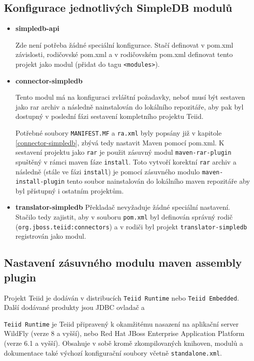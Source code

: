 \documentclass[oneside,12pt,final]{fithesis2}
\begin{document}
\subsection{Konfigurace jednotlivých SimpleDB modulů}
\label{konfigurace}
\begin{itemize}
 \item \textbf{simpledb-api}
 
 Zde není potřeba žádné speciální konfigurace. Stačí definovat v pom.xml závislosti, rodičovské pom.xml a v rodičovském pom.xml definovat tento projekt jako modul (přidat do tagu \texttt{<modules>}).
 \item \textbf{connector-simpledb}
 
 Tento modul má na konfiguraci zvláštní požadavky, neboť musí být sestaven jako rar archiv a následně nainstalován do lokálního repozitáře, aby pak byl dostupný v poslední fázi sestavení kompletního projektu Teiid.
 
 Potřebné soubory \texttt{MANIFEST.MF} a \texttt{ra.xml} byly popsány již v kapitole \ref{connector-simpledb}, zbývá tedy nastavit Maven pomocí pom.xml.
 K sestavení projektu jako \texttt{rar} je použit zásuvný modul \texttt{maven-rar-plugin} spuštěný v rámci maven fáze \texttt{install}. Toto vytvoří korektní \texttt{rar} archiv a následně (stále ve fázi \texttt{install}) je pomocí zásuvného modulo \texttt{maven-install-plugin} tento soubor nainstalován do lokálního maven repozitáře aby byl přístupný i ostatním projektům.
 
 \item \textbf{translator-simpledb}
 Překladač nevyžaduje žádné speciální nastavení. Stačilo tedy zajistit, aby v souboru \texttt{pom.xml} byl definován správný rodič (\texttt{org.jboss.teiid:connectors}) a v rodiči byl projekt \texttt{translator-simpledb} registrován jako modul.
\end{itemize}

\subsection{Nastavení zásuvného modulu maven assembly plugin}
Projekt Teiid je dodáván v distribucích \texttt{Teiid Runtime} nebo \texttt{Teiid Embedded}. Další dodávané produkty jsou JDBC ovladač a 

\texttt{Teiid Runtime} je Teiid připravený k okamžitému nasazení na aplikační server WildFly (verze 8 a vyšší), nebo Red Hat JBoss Enterprise Application Platform (verze 6.1 a vyšší). Obsahuje v sobě kromě zkompilovaných knihoven, modulů a dokumentace také výchozí konfigurační soubory včetně \texttt{standalone.xml}.
\end{document}
